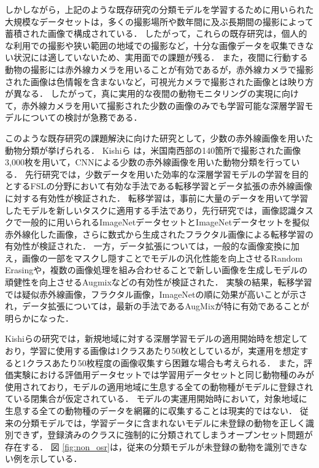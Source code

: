 \documentclass[a4paper,11pt,nomag]{jsreport}
\begin{document}
しかしながら，上記のような既存研究の分類モデルを学習するために用いられた大規模なデータセットは，多くの撮影場所や数年間に及ぶ長期間の撮影によって蓄積された画像で構成されている．
したがって，これらの既存研究は，個人的な利用での撮影や狭い範囲の地域での撮影など，十分な画像データを収集できない状況には適していないため、実用面での課題が残る．
また，夜間に行動する動物の撮影には赤外線カメラを用いることが有効であるが，赤外線カメラで撮影された画像は色情報を含まないなど，可視光カメラで撮影された画像とは映り方が異なる．
したがって，真に実用的な夜間の動物モニタリングの実現に向けて，赤外線カメラを用いて撮影された少数の画像のみでも学習可能な深層学習モデルについての検討が急務である．

このような既存研究の課題解決に向けた研究として，少数の赤外線画像を用いた動物分類が挙げられる．
Kishiら \cite{kishimoto2023}は，米国南西部の140箇所で撮影された画像3,000枚を用いて，CNNによる少数の赤外線画像を用いた動物分類を行っている．
先行研究では，少数データを用いた効率的な深層学習モデルの学習を目的とするFSLの分野において有効な手法である転移学習とデータ拡張の赤外線画像に対する有効性が検証された．
転移学習は，事前に大量のデータを用いて学習したモデルを新しいタスクに適用する手法であり，先行研究では，画像認識タスクで一般的に用いられるImageNetデータセットとImageNetデータセットを擬似赤外線化した画像，さらに数式から生成されたフラクタル画像による転移学習の有効性が検証された．
一方，データ拡張については，一般的な画像変換に加え，画像の一部をマスクし隠すことでモデルの汎化性能を向上させるRandom Erasingや，複数の画像処理を組み合わせることで新しい画像を生成しモデルの頑健性を向上させるAugmixなどの有効性が検証された．
実験の結果，転移学習では疑似赤外線画像，フラクタル画像，ImageNetの順に効果が高いことが示され，データ拡張については，最新の手法であるAugMixが特に有効であることが明らかになった．

Kishiらの研究では，新規地域に対する深層学習モデルの適用開始時を想定しており，学習に使用する画像は1クラスあたり50枚としているが，実運用を想定すると1クラスあたり50枚程度の画像収集すら困難な場合も考えられる．
また，評価実験における評価用データセットでは学習用データセットと同じ動物種のみが使用されており，モデルの適用地域に生息する全ての動物種がモデルに登録されている閉集合が仮定されている．
モデルの実運用開始時において，対象地域に生息する全ての動物種のデータを網羅的に収集することは現実的ではない．
従来の分類モデルでは，学習データに含まれないモデルに未登録の動物を正しく識別できず，登録済みのクラスに強制的に分類されてしまうオープンセット問題が存在する．
図 \ref{fig:non_osr}は，従来の分類モデルが未登録の動物を識別できない例を示している．
\end{document}

